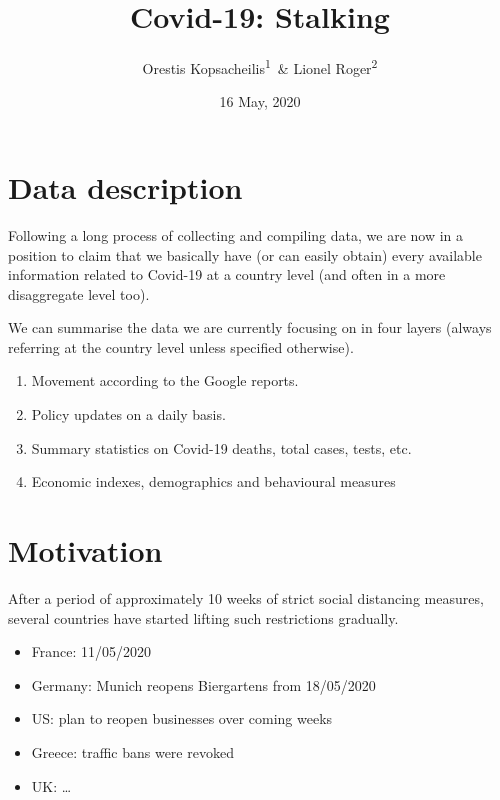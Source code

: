 \documentclass[
  english,
  ,doc,floatsintext]{apa6}
\author{Orestis Kopsacheilis\textsuperscript{1}\ \& Lionel Roger\textsuperscript{2}}
\affiliation{
\vspace{0.5cm}
\textsuperscript{1} School of Economics, University of Nottingham\\\textsuperscript{2} ODI}
\title{Covid-19: Stalking}
\date{16 May, 2020}
\providecommand{\tightlist}{%
  \setlength{\itemsep}{0pt}\setlength{\parskip}{0pt}}
\begin{document}
\maketitle

{
\setcounter{tocdepth}{2}
\tableofcontents
}
\hypertarget{data-description}{%
\section{Data description}\label{data-description}}

Following a long process of collecting and compiling data, we are now in a position to claim that we basically have (or can easily obtain) every available information related to Covid-19 at a country level (and often in a more disaggregate level too).

We can summarise the data we are currently focusing on in four layers (always referring at the country level unless specified otherwise).

\begin{enumerate}
\def\labelenumi{\arabic{enumi}.}
\tightlist
\item
  Movement according to the Google reports.
\item
  Policy updates on a daily basis.
\item
  Summary statistics on Covid-19 deaths, total cases, tests, etc.
\item
  Economic indexes, demographics and behavioural measures
\end{enumerate}

\hypertarget{motivation}{%
\section{Motivation}\label{motivation}}

After a period of approximately 10 weeks of strict social distancing measures, several countries have started lifting such restrictions gradually.

\begin{itemize}
\tightlist
\item
  France: 11/05/2020
\item
  Germany: Munich reopens Biergartens from 18/05/2020
\item
  US: plan to reopen businesses over coming weeks
\item
  Greece: traffic bans were revoked
\item
  UK: \ldots{}
\end{itemize}
\end{document}
